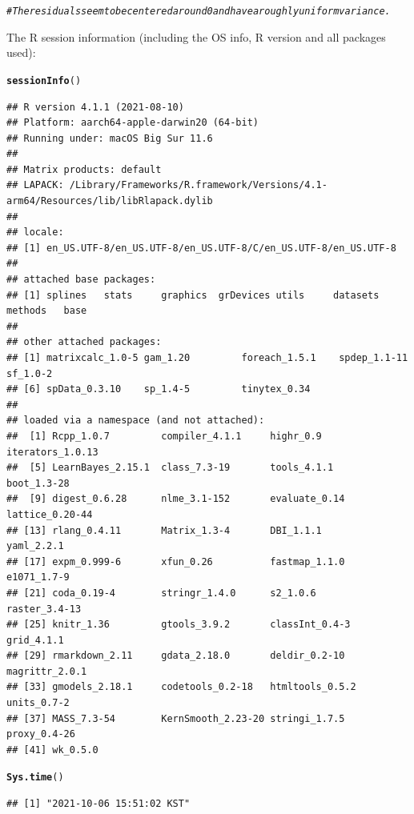 \documentclass{article}\usepackage[]{graphicx}\usepackage[]{color}
\makeatletter
\newcommand{\hlcom}[1]{\textcolor[rgb]{0.678,0.584,0.686}{\textit{#1}}}%
\newcommand{\hlstd}[1]{\textcolor[rgb]{0.345,0.345,0.345}{#1}}%
\newcommand{\hlkwd}[1]{\textcolor[rgb]{0.737,0.353,0.396}{\textbf{#1}}}%
\newenvironment{kframe}{%
 \def\at@end@of@kframe{}%
 \ifinner\ifhmode%
  \def\at@end@of@kframe{\end{minipage}}%
  \begin{minipage}{\columnwidth}%
 \fi\fi%
 \def\FrameCommand##1{\hskip\@totalleftmargin \hskip-\fboxsep
 \colorbox{shadecolor}{##1}\hskip-\fboxsep
     \hskip-\linewidth \hskip-\@totalleftmargin \hskip\columnwidth}%
 \MakeFramed {\advance\hsize-\width
   \@totalleftmargin\z@ \linewidth\hsize
   \@setminipage}}%
 {\par\unskip\endMakeFramed%
 \at@end@of@kframe}
\newenvironment{knitrout}{}{} %
\makeatother
\begin{document}
\begin{knitrout}
{}


\begin{kframe}\begin{alltt}
\hlcom{#The residuals seem to be centered around 0 and have a roughly uniform variance. }
\end{alltt}
\end{kframe}
\end{knitrout}

The R session information (including the OS info, R version and all
packages used):

\begin{knitrout}
\color{fgcolor}\begin{kframe}
\begin{alltt}
\hlkwd{sessionInfo}\hlstd{()}
\end{alltt}
\begin{verbatim}
## R version 4.1.1 (2021-08-10)
## Platform: aarch64-apple-darwin20 (64-bit)
## Running under: macOS Big Sur 11.6
## 
## Matrix products: default
## LAPACK: /Library/Frameworks/R.framework/Versions/4.1-arm64/Resources/lib/libRlapack.dylib
## 
## locale:
## [1] en_US.UTF-8/en_US.UTF-8/en_US.UTF-8/C/en_US.UTF-8/en_US.UTF-8
## 
## attached base packages:
## [1] splines   stats     graphics  grDevices utils     datasets  methods   base     
## 
## other attached packages:
## [1] matrixcalc_1.0-5 gam_1.20         foreach_1.5.1    spdep_1.1-11     sf_1.0-2        
## [6] spData_0.3.10    sp_1.4-5         tinytex_0.34    
## 
## loaded via a namespace (and not attached):
##  [1] Rcpp_1.0.7         compiler_4.1.1     highr_0.9          iterators_1.0.13  
##  [5] LearnBayes_2.15.1  class_7.3-19       tools_4.1.1        boot_1.3-28       
##  [9] digest_0.6.28      nlme_3.1-152       evaluate_0.14      lattice_0.20-44   
## [13] rlang_0.4.11       Matrix_1.3-4       DBI_1.1.1          yaml_2.2.1        
## [17] expm_0.999-6       xfun_0.26          fastmap_1.1.0      e1071_1.7-9       
## [21] coda_0.19-4        stringr_1.4.0      s2_1.0.6           raster_3.4-13     
## [25] knitr_1.36         gtools_3.9.2       classInt_0.4-3     grid_4.1.1        
## [29] rmarkdown_2.11     gdata_2.18.0       deldir_0.2-10      magrittr_2.0.1    
## [33] gmodels_2.18.1     codetools_0.2-18   htmltools_0.5.2    units_0.7-2       
## [37] MASS_7.3-54        KernSmooth_2.23-20 stringi_1.7.5      proxy_0.4-26      
## [41] wk_0.5.0
\end{verbatim}
\begin{alltt}
\hlkwd{Sys.time}\hlstd{()}
\end{alltt}
\begin{verbatim}
## [1] "2021-10-06 15:51:02 KST"
\end{verbatim}
\end{kframe}
\end{knitrout}
\end{document}
